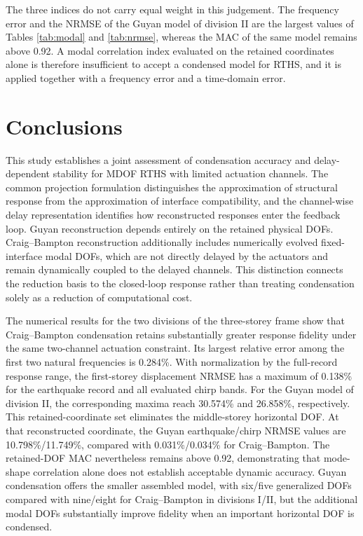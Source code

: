 \documentclass[a4paper,fleqn,review,12pt]{cas-sc}
\begin{document}
The three indices do not carry equal weight in this judgement. The frequency error and the NRMSE of the Guyan model of division II are the largest values of Tables \ref{tab:modal} and \ref{tab:nrmse}, whereas the MAC of the same model remains above 0.92. A modal correlation index evaluated on the retained coordinates alone is therefore insufficient to accept a condensed model for RTHS, and it is applied together with a frequency error and a time-domain error.




\section{Conclusions} \label{sec6}

This study establishes a joint assessment of condensation accuracy and delay-dependent stability for MDOF RTHS with limited actuation channels. The common projection formulation distinguishes the approximation of structural response from the approximation of interface compatibility, and the channel-wise delay representation identifies how reconstructed responses enter the feedback loop. Guyan reconstruction depends entirely on the retained physical DOFs. Craig--Bampton reconstruction additionally includes numerically evolved fixed-interface modal DOFs, which are not directly delayed by the actuators and remain dynamically coupled to the delayed channels. This distinction connects the reduction basis to the closed-loop response rather than treating condensation solely as a reduction of computational cost.

The numerical results for the two divisions of the three-storey frame show that Craig--Bampton condensation retains substantially greater response fidelity under the same two-channel actuation constraint. Its largest relative error among the first two natural frequencies is 0.284\%. With normalization by the full-record response range, the first-storey displacement NRMSE has a maximum of 0.138\% for the earthquake record and all evaluated chirp bands. For the Guyan model of division II, the corresponding maxima reach 30.574\% and 26.858\%, respectively. This retained-coordinate set eliminates the middle-storey horizontal DOF. At that reconstructed coordinate, the Guyan earthquake/chirp NRMSE values are 10.798\%/11.749\%, compared with 0.031\%/0.034\% for Craig--Bampton. The retained-DOF MAC nevertheless remains above 0.92, demonstrating that mode-shape correlation alone does not establish acceptable dynamic accuracy. Guyan condensation offers the smaller assembled model, with six/five generalized DOFs compared with nine/eight for Craig--Bampton in divisions I/II, but the additional modal DOFs substantially improve fidelity when an important horizontal DOF is condensed.
\end{document}
